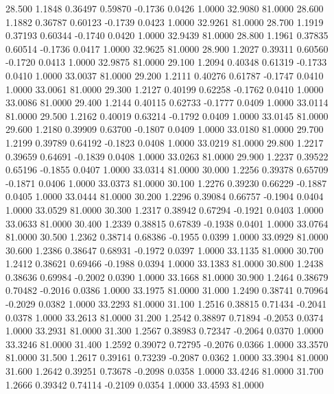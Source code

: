   28.500   1.1848   0.36497   0.59870  -0.1736   0.0426   1.0000  32.9080  81.0000
  28.600   1.1882   0.36787   0.60123  -0.1739   0.0423   1.0000  32.9261  81.0000
  28.700   1.1919   0.37193   0.60344  -0.1740   0.0420   1.0000  32.9439  81.0000
  28.800   1.1961   0.37835   0.60514  -0.1736   0.0417   1.0000  32.9625  81.0000
  28.900   1.2027   0.39311   0.60560  -0.1720   0.0413   1.0000  32.9875  81.0000
  29.100   1.2094   0.40348   0.61319  -0.1733   0.0410   1.0000  33.0037  81.0000
  29.200   1.2111   0.40276   0.61787  -0.1747   0.0410   1.0000  33.0061  81.0000
  29.300   1.2127   0.40199   0.62258  -0.1762   0.0410   1.0000  33.0086  81.0000
  29.400   1.2144   0.40115   0.62733  -0.1777   0.0409   1.0000  33.0114  81.0000
  29.500   1.2162   0.40019   0.63214  -0.1792   0.0409   1.0000  33.0145  81.0000
  29.600   1.2180   0.39909   0.63700  -0.1807   0.0409   1.0000  33.0180  81.0000
  29.700   1.2199   0.39789   0.64192  -0.1823   0.0408   1.0000  33.0219  81.0000
  29.800   1.2217   0.39659   0.64691  -0.1839   0.0408   1.0000  33.0263  81.0000
  29.900   1.2237   0.39522   0.65196  -0.1855   0.0407   1.0000  33.0314  81.0000
  30.000   1.2256   0.39378   0.65709  -0.1871   0.0406   1.0000  33.0373  81.0000
  30.100   1.2276   0.39230   0.66229  -0.1887   0.0405   1.0000  33.0444  81.0000
  30.200   1.2296   0.39084   0.66757  -0.1904   0.0404   1.0000  33.0529  81.0000
  30.300   1.2317   0.38942   0.67294  -0.1921   0.0403   1.0000  33.0633  81.0000
  30.400   1.2339   0.38815   0.67839  -0.1938   0.0401   1.0000  33.0764  81.0000
  30.500   1.2362   0.38714   0.68386  -0.1955   0.0399   1.0000  33.0929  81.0000
  30.600   1.2386   0.38647   0.68931  -0.1972   0.0397   1.0000  33.1135  81.0000
  30.700   1.2412   0.38621   0.69466  -0.1988   0.0394   1.0000  33.1383  81.0000
  30.800   1.2438   0.38636   0.69984  -0.2002   0.0390   1.0000  33.1668  81.0000
  30.900   1.2464   0.38679   0.70482  -0.2016   0.0386   1.0000  33.1975  81.0000
  31.000   1.2490   0.38741   0.70964  -0.2029   0.0382   1.0000  33.2293  81.0000
  31.100   1.2516   0.38815   0.71434  -0.2041   0.0378   1.0000  33.2613  81.0000
  31.200   1.2542   0.38897   0.71894  -0.2053   0.0374   1.0000  33.2931  81.0000
  31.300   1.2567   0.38983   0.72347  -0.2064   0.0370   1.0000  33.3246  81.0000
  31.400   1.2592   0.39072   0.72795  -0.2076   0.0366   1.0000  33.3570  81.0000
  31.500   1.2617   0.39161   0.73239  -0.2087   0.0362   1.0000  33.3904  81.0000
  31.600   1.2642   0.39251   0.73678  -0.2098   0.0358   1.0000  33.4246  81.0000
  31.700   1.2666   0.39342   0.74114  -0.2109   0.0354   1.0000  33.4593  81.0000
